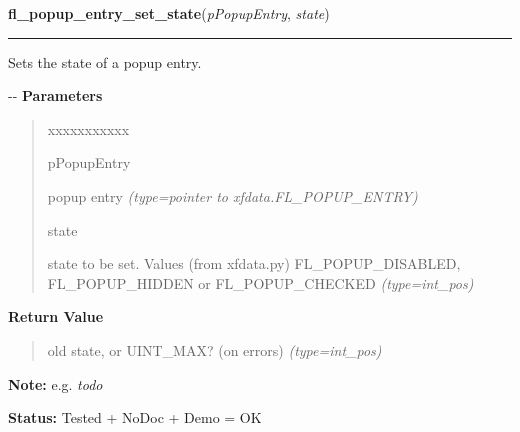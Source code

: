 \hspace{.8\funcindent}\begin{boxedminipage}{\funcwidth}

    \raggedright \textbf{fl\_popup\_entry\_set\_state}(\textit{pPopupEntry}, \textit{state})

    \vspace{-1.5ex}

    \rule{\textwidth}{0.5\fboxrule}
\setlength{\parskip}{2ex}

Sets the state of a popup entry.

-{}-
\setlength{\parskip}{1ex}
      \textbf{Parameters}
      \vspace{-1ex}

      \begin{quote}
        \begin{Ventry}{xxxxxxxxxxx}

          \item[pPopupEntry]


popup entry
            {\it (type=pointer to xfdata.FL\_POPUP\_ENTRY)}

          \item[state]


state to be set. Values (from xfdata.py) FL\_POPUP\_DISABLED,
FL\_POPUP\_HIDDEN or FL\_POPUP\_CHECKED
            {\it (type=int\_pos)}

        \end{Ventry}

      \end{quote}

      \textbf{Return Value}
    \vspace{-1ex}

      \begin{quote}

old state, or UINT\_MAX? (on errors)
      {\it (type=int\_pos)}

      \end{quote}

\textbf{Note:} 
e.g. \emph{todo}


\textbf{Status:} 
Tested + NoDoc + Demo = OK


    \end{boxedminipage}

    \label{xformslib:flpopup:fl_popup_entry_clear_state}

    \vspace{0.5ex}

